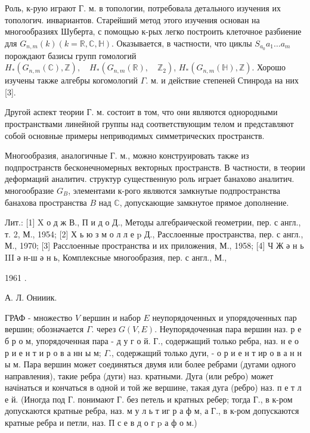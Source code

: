 \documentclass[10pt]{article}
\begin{document}
Роль, к-рую играют Г. м. в топологии, потребовала детального изучения их топологич. инвариантов. Старейший метод этого изучения основан на многообразиях Шуберта, с помощью к-рых легко построить клеточное разбиение для $G_{n, m}(k)(k=\mathbb{R}, \mathbb{C}, \mathbb{H})$. Оказывается, в частности, что циклы $S_{a_{0}} a_{1} \ldots a_{m}$ порождают базисы групп гомологий $H_{*}\left(G_{n, m}(\mathbb{C}), \mathbb{Z}\right), \quad H_{*}\left(G_{n, m}(\mathbb{R}), \quad \mathbb{Z}_{2}\right)$, $H_{*}\left(G_{n, m}(\mathbb{H}), \mathbb{Z}\right)$. Хорошо изучены также алгебры когомологий $\Gamma$. м. и действие степеней Стинрода на них [3].



Другой аспект теории Г. м. состоит в том, что они являются однородными пространствами линейной группы над соответствующим телом и представляют собой основные примеры неприводимых симметрических пространств.



Многообразия, аналогичные Г. м., можно конструировать также из подпространств бесконечномерных векторных пространств. В частности, в теории деформаций аналитич. структур существенную роль играет банахово аналитич. многообразие $G_{B}$, элементами к-рого являются замкнутые подпространства банахова пространства $B$ над $\mathbb{C}$, допускающие замкнутое прямое дополнение.



Лит.: [1] X о д ж В., П и д о Д., Методы алгебраической геометрии, пер. с англ., т. 2, М., 1954; [2] Х ь ю з м о л л е p Д., Расслоенные пространства, пер. с англ., М., 1970; [3] Расслоенные пространства и их приложения, М., 1958; [4] Ч Ж ә н ь III ә н-ш ә н ь, Комплексные многообразия, пер. с англ., М.,

1961 .

А. Л. Онииик.



ГРАФ - множество $V$ вершин и набор $E$ неупорядоченных и упорядоченных пар вершин; обозначается $\Gamma$. через $G(V, E)$. Неупорядоченная пара вершин наз. р е б р о м, упорядоченная пара - д у г о й. Г., содержащий только ребра, наз. н е о р и е н т и р о в а нн ы м; $\Gamma .$, содержащий только дуги, - о р и е н т ир о в а н н ы м. Пара вершин может соединяться двумя или более ребрами (дугами одного направления), такие ребра (дуги) наз. кратными. Дуга (или ребро) может начінаться и кончаться в одной и той же вершине, такая дуга (ребро) наз. п е т л е й. (Иногда под Г. понимают $Г$. без петель и кратных ребер; тогда Г., в к-ром допускаются кратные ребра, наз. м у л ь т иг р а ф м, а Г., в к-ром допускаются кратные ребра и петли, наз. П с е в д о г p а ф о м.)
\end{document}
